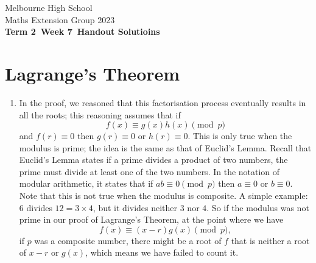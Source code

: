 \documentclass[a4paper]{article}
\title{{\thepdftitle}}
\author{Nathan Wong\and Tom Yan}
\date{2023}
\newcommand{\theterm}{2}
\newcommand{\theweek}{7}
\newcommand{\thedisplaytitle}{Term \theterm\ Week \theweek\  Handout Solutioins}
\begin{document}
\noindent Melbourne High School\\
\noindent Maths Extension Group 2023\\
\noindent \textbf{\thedisplaytitle}\\
\section*{Lagrange's Theorem}
\begin{enumerate}
\item In the proof, we reasoned that this factorisation
  process eventually results in all the roots; this reasoning 
  assumes that if \[f(x)\equiv g(x)h(x)\pmod{p}\] and \(f(r)\equiv0\)
  then \(g(r)\equiv0\) or \(h(r)\equiv0\). This is only true when
  the modulus is prime; the idea is the same as that of
  Euclid's Lemma. Recall that Euclid's Lemma states if a prime divides
  a product of two numbers, the prime must divide at least one of
  the two numbers. In the notation of modular arithmetic, it states that
  if \(ab\equiv0\pmod{p}\) then \(a\equiv0\) or \(b\equiv0\). Note that
  this is not true when the modulus is composite. A simple example: \(6\)
  divides \(12=3\times 4\), but it divides neither \(3\) nor \(4\).
  So if the modulus was not prime in our proof of Lagrange's Theorem, at
  the point where we have \[f(x)\equiv (x-r)g(x)\pmod{p},\] if \(p\) was
  a composite number, there might be a root of \(f\) that is neither a root
  of \(x-r\) or \(g(x)\), which means we have failed to count it.


\end{enumerate}
\end{document}
